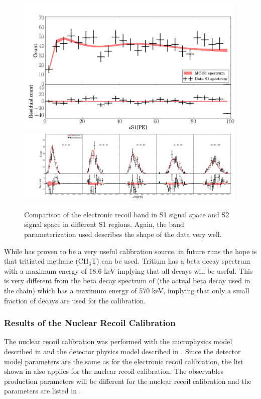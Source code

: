 	
\begin{figure}[t]
	\centering
	\includegraphics[width=0.99\textwidth]{xe1t_er_band_s1}
	\includegraphics[width=0.99\textwidth]{xe1t_er_band_s2}
	\caption{Comparison of the electronic recoil band in S1 signal space and S2 signal space in different S1 regions.  Again, the band parameterization used describes the shape of the data very well.}
	\label{fig:xe1t_er_band_width_median}
\end{figure}

While  has proven to be a very useful calibration source, in future runs the hope is that tritiated methane ($\textrm{CH}_3\textrm{T}$) can be used.  Tritium has a beta decay spectrum with a maximum energy of 18.6 keV implying that all decays will be useful.  This is very different from the beta decay spectrum of  (the actual beta decay used in the  chain) which has a maximum energy of 570 keV, implying that only a small fraction of decays are used for the calibration.


\subsubsection{Results of the Nuclear Recoil Calibration}

The nuclear recoil calibration was performed with the microphysics model described in  and the detector physics model described in .  Since the detector model parameters are the same as for the electronic recoil calibration, the list shown in  also applies for the nuclear recoil calibration.  The observables production parameters will be different for the nuclear recoil calibration and the parameters are listed in .


